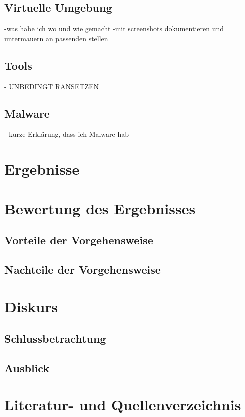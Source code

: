 \documentclass[12pt,oneside]{article}
\begin{document}
\subsection{Virtuelle Umgebung}
-was habe ich wo und wie gemacht
\newline
-mit screenshots dokumentieren und untermauern an passenden stellen
\subsection{Tools}
- UNBEDINGT RANSETZEN
\subsection{Malware}
- kurze Erklärung, dass ich Malware hab
\newpage

\section{Ergebnisse}
\newpage

\section{Bewertung des Ergebnisses}
\subsection{Vorteile der Vorgehensweise}
\subsection{Nachteile der Vorgehensweise}
\newpage

\section{Diskurs}
\subsection{Schlussbetrachtung}
\subsection{Ausblick}
\newpage 


\section{Literatur- und Quellenverzeichnis}
\end{document}
